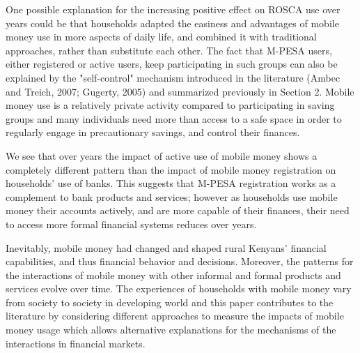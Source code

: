 \documentclass[11pt]{article}
\numberwithin{equation}{section}
\begin{document}
One possible explanation for the increasing positive effect on ROSCA use over years could be that households adapted the easiness and advantages of mobile money use in more aspects of daily life, and combined it with traditional approaches, rather than substitute each other. The fact that M-PESA users, either registered or active users, keep participating in such groups can also be explained by the "self-control" mechanism introduced in the literature (Ambec and Treich, 2007; Gugerty, 2005) and summarized previously in Section 2. Mobile money use is a relatively private activity compared to participating in saving groups and many individuals need more than access to a safe space in order to regularly engage in precautionary savings, and control their finances.

We see that over years the impact of active use of mobile money shows a completely different pattern than the impact of mobile money registration on households' use of banks. This suggests that M-PESA registration works as a complement to bank products and services; however as households use mobile money their accounts actively, and are more capable of their finances, their need to access more formal financial systems reduces over years.


Inevitably, mobile money had changed and shaped rural Kenyans' financial capabilities, and thus financial behavior and decisions. Moreover, the patterns for the interactions of mobile money with other informal and formal products and services evolve over time. The experiences of households with mobile money vary from society to society in developing world and this paper contributes to the literature by considering different approaches to measure the impacts of mobile money usage which allows alternative explanations for the mechanisms of the interactions in financial markets. 




\clearpage

\footnotesize

\nocite{*}

\clearpage
\appendix

\footnotesize
\end{document}
